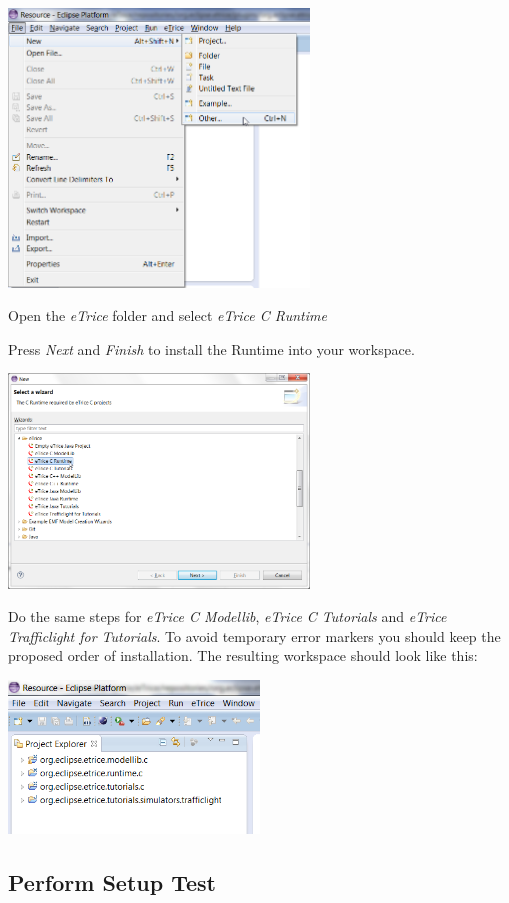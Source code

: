 \includegraphics[width=0.6\textwidth]{images/013-SetupWorkspace02.png}

Open the \emph{eTrice} folder and select \textit{eTrice C Runtime}

Press \emph{Next} and \emph{Finish} to install the Runtime into your workspace.

\includegraphics[width=0.6\textwidth]{images/014-SetupWorkspaceC005.png}

Do the same steps for \textit{eTrice C Modellib}, \textit{eTrice C Tutorials} and \textit{eTrice Trafficlight for Tutorials}. To avoid temporary 
error markers you should keep the proposed order of installation. The resulting workspace should look like 
this:

\includegraphics[width=0.5\textwidth]{images/014-SetupWorkspace007.png}

\subsection{Perform Setup Test}

